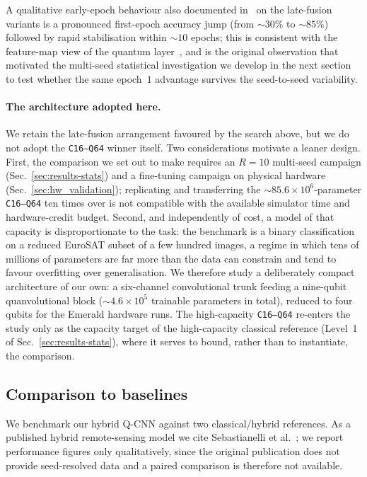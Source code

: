 A qualitative early-epoch behaviour also documented
in~\cite{Filippi2025Thesis} on the late-fusion variants is a
pronounced first-epoch accuracy jump (from $\sim 30\%$ to $\sim 85\%$)
followed by rapid stabilisation within $\sim 10$ epochs; this is
consistent with the feature-map view of the quantum
layer~\cite{Schuld2019PRA,Havlicek2019}, and is the original
observation that motivated the multi-seed statistical investigation we
develop in the next section to test whether the same epoch~$1$
advantage survives the seed-to-seed variability.

\paragraph{The architecture adopted here.}
We retain the late-fusion arrangement favoured by the search above, but we do
not adopt the \texttt{C16--Q64} winner itself. Two considerations motivate a
leaner design. First, the comparison we set out to make requires an $R=10$
multi-seed campaign (Sec.~\ref{sec:results-stats}) and a fine-tuning campaign on
physical hardware (Sec.~\ref{sec:hw_validation}); replicating and transferring
the $\sim\!85.6\times10^{6}$-parameter \texttt{C16--Q64} ten times over is not
compatible with the available simulator time and hardware-credit budget. Second,
and independently of cost, a model of that capacity is disproportionate to the
task: the benchmark is a binary classification on a reduced EuroSAT subset of a
few hundred images, a regime in which tens of millions of parameters are far
more than the data can constrain and tend to favour overfitting over
generalisation. We therefore study a deliberately compact architecture of our
own: a six-channel convolutional trunk feeding a nine-qubit quanvolutional block
($\sim\!4.6\times10^{5}$ trainable parameters in total), reduced to four qubits
for the Emerald hardware runs. The high-capacity \texttt{C16--Q64} re-enters the
study only as the capacity target of the high-capacity classical reference
(Level~1 of Sec.~\ref{sec:results-stats}), where it serves to bound, rather than
to instantiate, the comparison.

\subsection{Comparison to baselines}
\label{sec:baselines}
We benchmark our hybrid Q-CNN against two classical/hybrid references. As a published hybrid remote-sensing model we cite Sebastianelli et al.~\cite{Sebastianelli2021}; we report performance figures only qualitatively, since the original publication does not provide seed-resolved data and a paired comparison is therefore not available.

